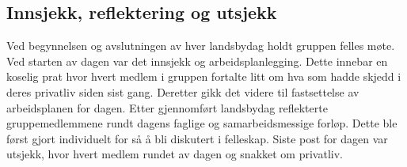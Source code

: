 \subsection{Innsjekk, reflektering og utsjekk}

Ved begynnelsen og avslutningen av hver landsbydag holdt gruppen felles møte.
Ved starten av dagen var det innsjekk og arbeidsplanlegging.
Dette innebar en koselig prat hvor hvert medlem i gruppen fortalte litt om hva som hadde skjedd i deres privatliv siden sist gang.
Deretter gikk det videre til fastsettelse av arbeidsplanen for dagen.
Etter gjennomført landsbydag reflekterte gruppemedlemmene rundt dagens faglige og samarbeidsmessige forløp.
Dette ble først gjort individuelt for så å bli diskutert i felleskap.
Siste post for dagen var utsjekk, hvor hvert medlem rundet av dagen og snakket om privatliv.
\\